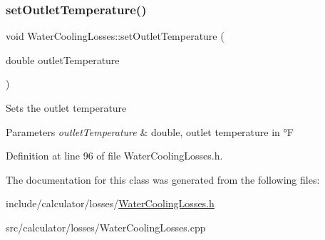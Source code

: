 \subsubsection{\texorpdfstring{set\+Outlet\+Temperature()}{setOutletTemperature()}}
{\footnotesize\ttfamily void Water\+Cooling\+Losses\+::set\+Outlet\+Temperature (\begin{DoxyParamCaption}\item[{double}]{outlet\+Temperature }\end{DoxyParamCaption})\hspace{0.3cm}{\ttfamily [inline]}}

Sets the outlet temperature


\begin{DoxyParams}{Parameters}
{\em outlet\+Temperature} & double, outlet temperature in °F \\
\hline
\end{DoxyParams}


Definition at line 96 of file Water\+Cooling\+Losses.\+h.



The documentation for this class was generated from the following files\+:\begin{DoxyCompactItemize}
\item 
include/calculator/losses/\hyperlink{_water_cooling_losses_8h}{Water\+Cooling\+Losses.\+h}\item 
src/calculator/losses/Water\+Cooling\+Losses.\+cpp\end{DoxyCompactItemize}
